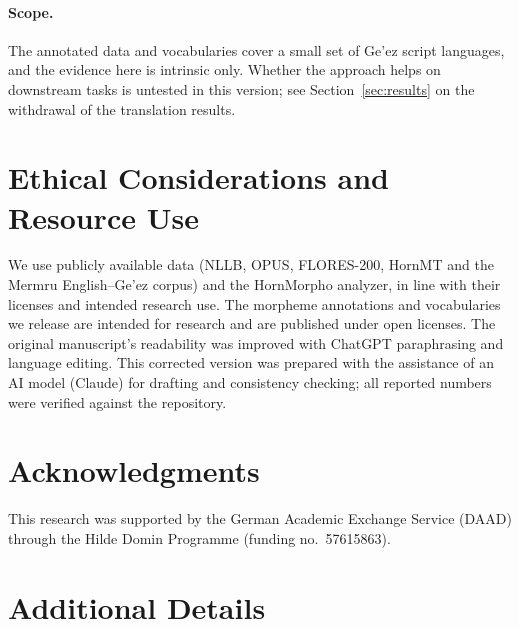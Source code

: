 \documentclass[11pt]{article}
\begin{document}
\paragraph{Scope.} The annotated data and vocabularies cover a small set of
Ge'ez script languages, and the evidence here is intrinsic only. Whether the
approach helps on downstream tasks is untested in this version; see
Section~\ref{sec:results} on the withdrawal of the translation results.

\section*{Ethical Considerations and Resource Use}

We use publicly available data (NLLB, OPUS, FLORES-200, HornMT and the Mermru
English--Ge'ez corpus) and the HornMorpho analyzer, in line with their
licenses and intended research use. The morpheme annotations and vocabularies
we release are intended for research and are published under open licenses.
The original manuscript's readability was improved with ChatGPT paraphrasing
and language editing. This corrected version was prepared with the assistance
of an AI model (Claude) for drafting and consistency checking; all reported
numbers were verified against the repository.

\section*{Acknowledgments}

This research was supported by the German Academic Exchange Service (DAAD)
through the Hilde Domin Programme (funding no.\ 57615863).



\appendix

\section{Additional Details}
\label{app:details}

\begin{table}[h]
  \centering
  \small
  
  \caption{MoVoC vocabulary budget and realised sizes (released
  configuration: $s=224{,}000$, $r=5/7$). The union is smaller than the sum
  of its parts because the sets overlap. The published version reported a
  152k bilingual vocabulary.}
  \label{tab:vocab}
\end{table}
\end{document}
